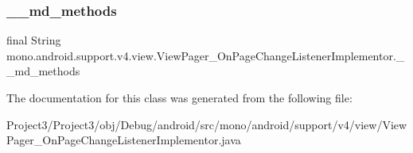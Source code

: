 \subsubsection{\texorpdfstring{\+\_\+\+\_\+md\+\_\+methods}{\_\_md\_methods}}
{\footnotesize\ttfamily final String mono.\+android.\+support.\+v4.\+view.\+View\+Pager\+\_\+\+On\+Page\+Change\+Listener\+Implementor.\+\_\+\+\_\+md\+\_\+methods\hspace{0.3cm}{\ttfamily [static]}}



The documentation for this class was generated from the following file\+:\begin{DoxyCompactItemize}
\item 
Project3/\+Project3/obj/\+Debug/android/src/mono/android/support/v4/view/View\+Pager\+\_\+\+On\+Page\+Change\+Listener\+Implementor.\+java\end{DoxyCompactItemize}
